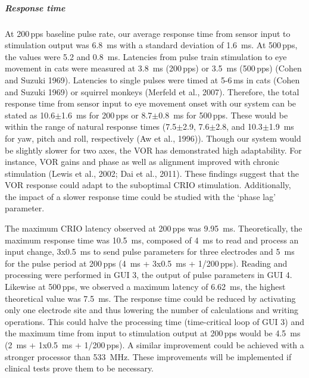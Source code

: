 \subparagraph{Response time}
At 200\,pps baseline pulse rate, our average response time from sensor input to stimulation output was \SI{6.8}{\milli\second} with a standard deviation of \SI{1.6}{\milli\second}. At 500\,pps, the values were 5.2 and \SI{0.8}{\milli\second}. Latencies from pulse train stimulation to eye movement in cats were measured at \SI{3.8}{\milli\second} (200\,pps) or \SI{3.5}{\milli\second} (500\,pps) (Cohen and Suzuki 1969). Latencies to single pulses were timed at 5-6\,ms in cats (Cohen and Suzuki 1969) or squirrel monkeys (Merfeld et al., 2007). Therefore, the total response time from sensor input to eye movement onset with our system can be stated as 10.6$\pm$\SI{1.6}{\milli\second} for 200\,pps or 8.7$\pm$\SI{0.8}{\milli\second} for 500\,pps. These would be within the range of natural response times (7.5$\pm$2.9, 7.6$\pm$2.8, and 10.3$\pm$\SI{1.9}{\milli\second} for yaw, pitch and roll, respectively (Aw et al., 1996)). Though our system would be slightly slower for two axes, the VOR has demonstrated high adaptability. For instance, VOR gains and phase as well as alignment improved with chronic stimulation (Lewis et al., 2002; Dai et al., 2011). These findings suggest that the VOR response could adapt to the suboptimal CRIO stimulation. Additionally, the impact of a slower response time could be studied with the ‘phase lag’ parameter.

The maximum CRIO latency observed at 200\,pps was \SI{9.95}{\milli\second}. Theoretically, the maximum response time was \SI{10.5}{\milli\second}, composed of \SI{4}{\milli\second} to read and process an input change, 3x\SI{0.5}{\milli\second} to send pulse parameters for three electrodes and \SI{5}{\milli\second} for the pulse period at 200\,pps (\SI{4}{\milli\second} + 3x\SI{0.5}{\milli\second} + 1/200\,pps). Reading and processing were performed in GUI 3, the output of pulse parameters in GUI 4. Likewise at 500\,pps, we observed a maximum latency of \SI{6.62}{\milli\second}, the highest theoretical value was \SI{7.5}{\milli\second}. The response time could be reduced by activating only one electrode site and thus lowering the number of calculations and writing operations. This could halve the processing time (time-critical loop of GUI 3) and the maximum time from input to stimulation output at 200\,pps would be \SI{4.5}{\milli\second} (\SI{2}{\milli\second} + 1x\SI{0.5}{\milli\second} + 1/200\,pps). A similar improvement could be achieved with a stronger processor than \SI{533}{\mega\hertz}. These improvements will be implemented if clinical tests prove them to be necessary. 

